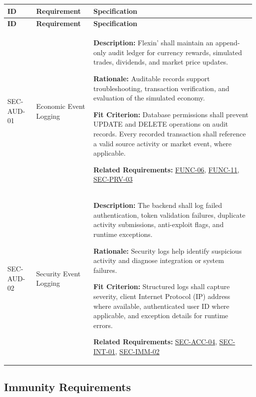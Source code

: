 \documentclass[12pt]{article}
\newcommand{\acr}[3]{\phantomsection\label{acr:#1}#2 (#3)}
\begin{document}
\small
\setlength{\tabcolsep}{4pt}
\begin{xltabular}{\textwidth}{|p{2.6cm}|p{3.4cm}|X|}
\hline
\textbf{ID} & \textbf{Requirement} & \textbf{Specification} \\
\hline
\endfirsthead
\hline
\textbf{ID} & \textbf{Requirement} & \textbf{Specification} \\
\hline
\endhead

SEC-AUD-01\hypertarget{req:SEC-AUD-01}{} &
Economic Event Logging &
\textbf{Description:} Flexin' shall maintain an append-only audit ledger for currency rewards, simulated trades, dividends, and market price updates.

\textbf{Rationale:} Auditable records support troubleshooting, transaction verification, and evaluation of the simulated economy.

\textbf{Fit Criterion:} Database permissions shall prevent UPDATE and DELETE operations on audit records. Every recorded transaction shall reference a valid source activity or market event, where applicable. 

\textbf{Related Requirements:} \hyperlink{req:FUNC-06}{FUNC-06}, \hyperlink{req:FUNC-11}{FUNC-11}, \hyperlink{req:SEC-PRV-03}{SEC-PRV-03}\\
\hline

SEC-AUD-02\hypertarget{req:SEC-AUD-02}{} &
Security Event Logging &
\textbf{Description:} The backend shall log failed authentication, token validation failures, duplicate activity submissions, anti-exploit flags, and runtime exceptions.

\textbf{Rationale:} Security logs help identify suspicious activity and diagnose integration or system failures.

\textbf{Fit Criterion:} Structured logs shall capture severity, client \acr{IP}{Internet Protocol}{IP} address where available, authenticated user ID where applicable, and exception details for runtime errors. 

\textbf{Related Requirements:} \hyperlink{req:SEC-ACC-04}{SEC-ACC-04}, \hyperlink{req:SEC-INT-01}{SEC-INT-01}, \hyperlink{req:SEC-IMM-02}{SEC-IMM-02}\\
\hline

\end{xltabular}
\subsection{Immunity Requirements}
\end{document}
